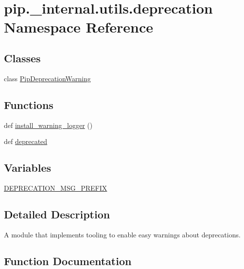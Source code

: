 \hypertarget{namespacepip_1_1__internal_1_1utils_1_1deprecation}{}\section{pip.\+\_\+internal.\+utils.\+deprecation Namespace Reference}
\label{namespacepip_1_1__internal_1_1utils_1_1deprecation}
\subsection*{Classes}
\begin{DoxyCompactItemize}
\item 
class \hyperlink{classpip_1_1__internal_1_1utils_1_1deprecation_1_1PipDeprecationWarning}{Pip\+Deprecation\+Warning}
\end{DoxyCompactItemize}
\subsection*{Functions}
\begin{DoxyCompactItemize}
\item 
def \hyperlink{namespacepip_1_1__internal_1_1utils_1_1deprecation_afa04727b8c5fce2a68979980a337a7d8}{install\+\_\+warning\+\_\+logger} ()
\item 
def \hyperlink{namespacepip_1_1__internal_1_1utils_1_1deprecation_ae7e3fd8e1e10a660ad0fe0735024a96c}{deprecated}
\end{DoxyCompactItemize}
\subsection*{Variables}
\begin{DoxyCompactItemize}
\item 
\hyperlink{namespacepip_1_1__internal_1_1utils_1_1deprecation_a97d140bd28db555bf6d755432a147060}{D\+E\+P\+R\+E\+C\+A\+T\+I\+O\+N\+\_\+\+M\+S\+G\+\_\+\+P\+R\+E\+F\+IX}
\end{DoxyCompactItemize}


\subsection{Detailed Description}
\begin{DoxyVerb}A module that implements tooling to enable easy warnings about deprecations.
\end{DoxyVerb}
 

\subsection{Function Documentation}
\mbox{\label{namespacepip_1_1__internal_1_1utils_1_1deprecation_ae7e3fd8e1e10a660ad0fe0735024a96c}} 
